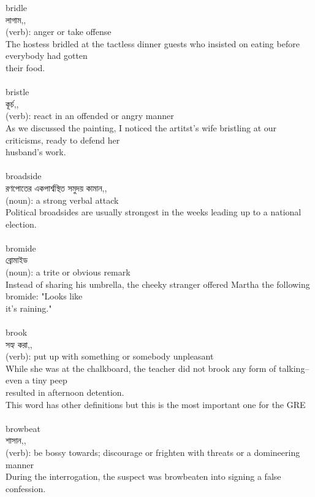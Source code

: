 \documentclass{article}
\begin{document}
{bridle}\\
{লাগাম,,}\\
{(verb): anger or take offense\\The hostess bridled at the tactless dinner guests who insisted on eating before everybody had gotten\\their food.\\}\\
{bristle}\\
{কূর্চ,,}\\
{(verb): react in an offended or angry manner\\As we discussed the painting, I noticed the artitst's wife bristling at our criticisms, ready to defend her\\husband's work.\\}\\
{broadside}\\
{রণপোতের একপার্শ্বস্থিত সমুদয় কামান,,}\\
{(noun): a strong verbal attack\\Political broadsides are usually strongest in the weeks leading up to a national election.\\}\\
{bromide}\\
{ব্রোমাইড}\\
{(noun): a trite or obvious remark\\Instead of sharing his umbrella, the cheeky stranger offered Martha the following bromide: "Looks like\\it's raining."\\}\\
{brook}\\
{সহ্য করা,,}\\
{(verb): put up with something or somebody unpleasant\\While she was at the chalkboard, the teacher did not brook any form of talking--even a tiny peep\\resulted in afternoon detention.\\This word has other definitions but this is the most important one for the GRE\\}\\
{browbeat}\\
{শাসান,,}\\
{(verb): be bossy towards; discourage or frighten with threats or a domineering manner\\During the interrogation, the suspect was browbeaten into signing a false confession.\\}\\
\end{document}
